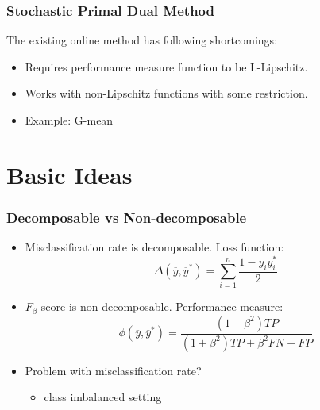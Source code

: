 \documentclass{beamer}
\begin{document}
\begin{frame}
	\frametitle{Stochastic Primal Dual Method}
	The existing online method has following shortcomings:
	\begin{itemize}
		\item Requires performance measure function to be L-Lipschitz.
		\item Works with non-Lipschitz functions with some restriction.
		\item Example: G-mean
	\end{itemize}
\end{frame}

\section{Basic Ideas} %


\begin{frame}
	\frametitle{Decomposable vs Non-decomposable}
	\begin{itemize}
		\item Misclassification rate is decomposable. Loss function:
		\begin{equation*}
		\Delta(\overline{y},\overline{y}^*) = \sum_{i=1}^{n} \frac{1-y_iy_i^*}{2}
		\end{equation*}
		\item $F_\beta$ score is non-decomposable. Performance measure:
		\begin{equation*}
		\phi(\overline{y},\overline{y}^*) = \frac{(1+\beta^2)TP}{(1+\beta^2)TP+\beta^2FN+FP}
		\end{equation*}
		\item Problem with misclassification rate?
		\begin{itemize}
			\item class imbalanced setting
		\end{itemize}
	\end{itemize}	
\end{frame}

\end{document}

